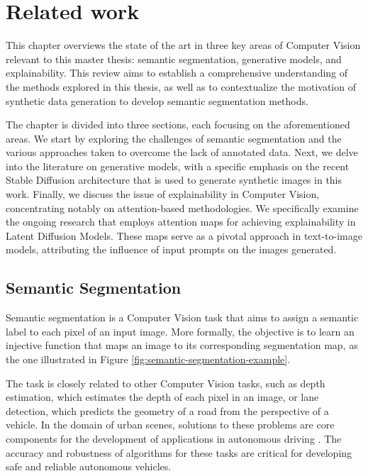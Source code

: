 
\chapter{Related work}
\label{cha:related-work}

This chapter overviews the state of the art in three key areas of Computer Vision relevant to this master thesis: semantic segmentation, generative models, and explainability. This review aims to establish a comprehensive understanding of the methods explored in this thesis, as well as to contextualize the motivation of synthetic data generation to develop semantic segmentation methods.

The chapter is divided into three sections, each focusing on the aforementioned areas. We start by exploring the challenges of semantic segmentation and the various approaches taken to overcome the lack of annotated data. Next, we delve into the literature on generative models, with a specific emphasis on the recent Stable Diffusion architecture that is used to generate synthetic images in this work. Finally, we discuss the issue of explainability in Computer Vision, concentrating notably on attention-based methodologies. We specifically examine the ongoing research that employs attention maps for achieving explainability in Latent Diffusion Models. These maps serve as a pivotal approach in text-to-image models, attributing the influence of input prompts on the images generated.



\section{Semantic Segmentation}

Semantic segmentation is a Computer Vision task that aims to assign a semantic label to each pixel of an input image. More formally, the objective is to learn an injective function that maps an image to its corresponding segmentation map, as the one illustrated in Figure \ref{fig:semantic-segmentation-example}.

The task is closely related to other Computer Vision tasks, such as depth estimation, which estimates the depth of each pixel in an image, or lane detection, which predicts the geometry of a road from the perspective of a vehicle. In the domain of urban scenes, solutions to these problems are core components for the development of applications in autonomous driving \cite{Grigorescu2019ASO}. The accuracy and robustness of algorithms for these tasks are critical for developing safe and reliable autonomous vehicles.

